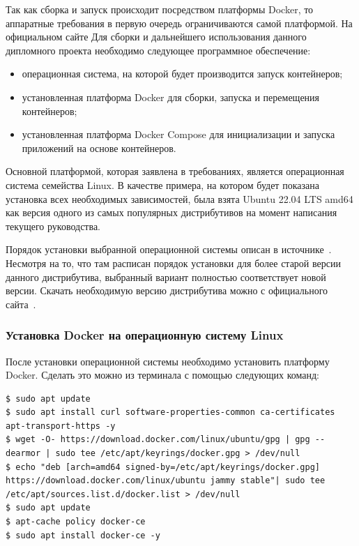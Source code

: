 Так как сборка и запуск происходит посредством платформы Docker, то аппаратные требования в первую очередь ограничиваются самой платформой.
На официальном сайте
Для сборки и дальнейшего использования данного дипломного проекта необходимо следующее программное обеспечение:
\begin{itemize}
    \item операционная система, на которой будет производится запуск контейнеров;
    \item установленная платформа Docker для сборки, запуска и перемещения контейнеров;
    \item установленная платформа Docker Compose для инициализации и запуска приложений на основе контейнеров.
\end{itemize}

Основной платформой, которая заявлена в требованиях, является операционная система семейства Linux.
В качестве примера, на котором будет показана установка всех необходимых
зависимостей, была взята Ubuntu 22.04 LTS amd64 как версия одного из самых популярных дистрибутивов на момент написания текущего руководства.


Порядок установки выбранной операционной системы описан в источнике~\cite{ubuntu_how_to_install}.
Несмотря на то, что там расписан порядок установки для более старой версии данного дистрибутива, выбранный вариант полностью соответствует новой версии.
Скачать необходимую версию дистрибутива можно с официального сайта~\cite{ubuntu_download_site}.

\subsubsection{Установка Docker на операционную систему Linux}

После установки операционной системы необходимо установить платформу Docker.
Сделать это можно из терминала с помощью следующих команд:

\begin{lstlisting}[basicstyle=\ttfamily\small]
$ sudo apt update
$ sudo apt install curl software-properties-common ca-certificates apt-transport-https -y
$ wget -O- https://download.docker.com/linux/ubuntu/gpg | gpg --dearmor | sudo tee /etc/apt/keyrings/docker.gpg > /dev/null
$ echo "deb [arch=amd64 signed-by=/etc/apt/keyrings/docker.gpg] https://download.docker.com/linux/ubuntu jammy stable"| sudo tee /etc/apt/sources.list.d/docker.list > /dev/null
$ sudo apt update
$ apt-cache policy docker-ce
$ sudo apt install docker-ce -y
\end{lstlisting}

